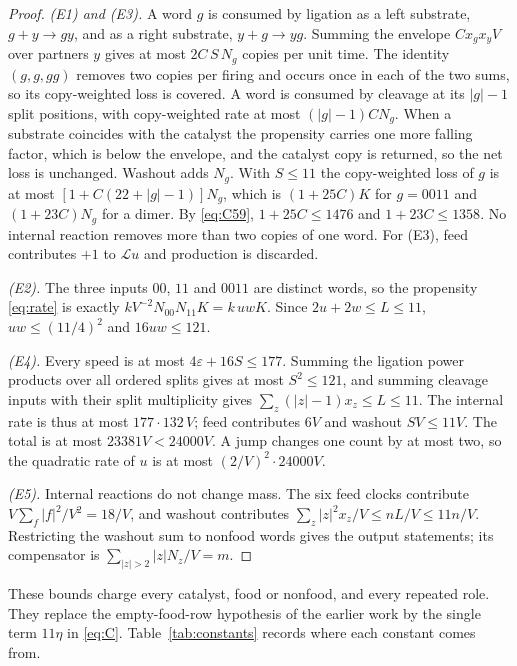 \documentclass[11pt,letterpaper]{article}
\theoremstyle{plain}
\theoremstyle{definition}
\theoremstyle{remark}
\numberwithin{equation}{section}
\newcommand{\cL}{\mathcal L}
\newcommand{\eps}{\varepsilon}
\begin{document}
\begin{proof}
\emph{(E1) and (E3).} A word $g$ is consumed by ligation as a left substrate, $g+y\to gy$, and as a right substrate, $y+g\to yg$. Summing the envelope $Cx_gx_yV$ over partners $y$ gives at most $2C\,S\,N_g$ copies per unit time. The identity $(g,g,gg)$ removes two copies per firing and occurs once in each of the two sums, so its copy-weighted loss is covered. A word is consumed by cleavage at its $|g|-1$ split positions, with copy-weighted rate at most $(|g|-1)CN_g$. When a substrate coincides with the catalyst the propensity carries one more falling factor, which is below the envelope, and the catalyst copy is returned, so the net loss is unchanged. Washout adds $N_g$. With $S\le11$ the copy-weighted loss of $g$ is at most $[1+C(22+|g|-1)]N_g$, which is $(1+25C)K$ for $g=0011$ and $(1+23C)N_g$ for a dimer. By \eqref{eq:C59}, $1+25C\le1476$ and $1+23C\le1358$. No internal reaction removes more than two copies of one word. For (E3), feed contributes $+1$ to $\cL u$ and production is discarded.

\emph{(E2).} The three inputs $00$, $11$ and $0011$ are distinct words, so the propensity \eqref{eq:rate} is exactly $kV^{-2}N_{00}N_{11}K=k\,uwK$. Since $2u+2w\le L\le11$, $uw\le(11/4)^2$ and $16uw\le121$.

\emph{(E4).} Every speed is at most $4\eps+16S\le177$. Summing the ligation power products over all ordered splits gives at most $S^2\le121$, and summing cleavage inputs with their split multiplicity gives $\sum_z(|z|-1)x_z\le L\le11$. The internal rate is thus at most $177\cdot132\,V$; feed contributes $6V$ and washout $SV\le11V$. The total is at most $23381V<24000V$. A jump changes one count by at most two, so the quadratic rate of $u$ is at most $(2/V)^2\cdot24000V$.

\emph{(E5).} Internal reactions do not change mass. The six feed clocks contribute $V\sum_f|f|^2/V^2=18/V$, and washout contributes $\sum_z|z|^2x_z/V\le nL/V\le11n/V$. Restricting the washout sum to nonfood words gives the output statements; its compensator is $\sum_{|z|>2}|z|N_z/V=m$.
\end{proof}
These bounds charge every catalyst, food or nonfood, and every repeated role. They replace the empty-food-row hypothesis of the earlier work by the single term $11\eta$ in \eqref{eq:C}. Table~\ref{tab:constants} records where each constant comes from.
\end{document}
